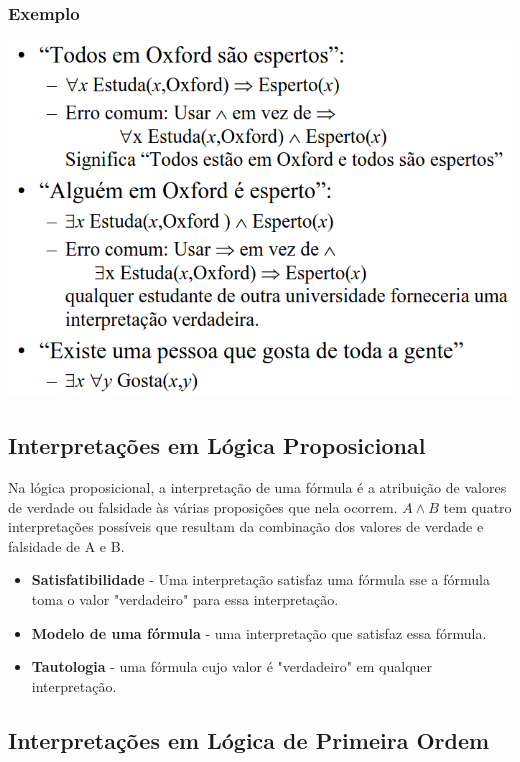 \documentclass{article}
\begin{document}
\subsubsection{Exemplo}

\begin{center}
  \includegraphics[scale=0.35]{27}
\end{center}

\subsection{Interpretações em Lógica Proposicional}

Na lógica proposicional, a interpretação de uma fórmula é a atribuição de valores de verdade
ou falsidade às várias proposições que nela ocorrem. \textbf{$A \wedge B$}  tem quatro interpretações possíveis que resultam da combinação dos valores de verdade e
falsidade de A e B.

\begin{itemize}
  \item \textbf{Satisfatibilidade} - Uma interpretação satisfaz uma fórmula
  sse a fórmula toma o valor "verdadeiro" para essa
  interpretação.
  \item \textbf{Modelo de uma fórmula} - uma interpretação que satisfaz
  essa fórmula.
  \item \textbf{Tautologia} - uma fórmula cujo valor é "verdadeiro" em
  qualquer interpretação. 
\end{itemize}

\pagebreak

\subsection{Interpretações em Lógica de Primeira Ordem}
\end{document}

